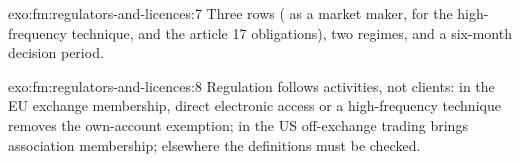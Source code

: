 \begin{solution}{exo:fm:regulators-and-licences:7}
Three rows ( as a market maker,  for the high-frequency technique, and the article 17 obligations), two regimes, and a
six-month decision period.
\end{solution}

\begin{solution}{exo:fm:regulators-and-licences:8}
Regulation follows activities, not clients: in the EU exchange membership, direct electronic access or a high-frequency technique removes the
own-account exemption; in the US off-exchange trading brings association membership; elsewhere the definitions must be checked.
\end{solution}

